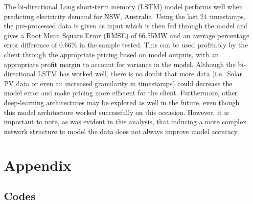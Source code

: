 \documentclass[mstat,12pt]{unswthesis}
\begin{document}
The bi-directional Long short-term memory (LSTM) model performs well
when predicting electricity demand for NSW, Australia. Using the last 24
timestamps, the pre-processed data is given as input which is then fed
through the model and gives a Root Mean Square Error (RMSE) of 66.55MW
and an average percentage error difference of 0.66\% in the sample
tested. This can be used profitably by the client through the
appropriate pricing based on model outputs, with an appropriate profit
margin to account for variance in the model. Although the bi-directional
LSTM has worked well, there is no doubt that more data (i.e.~Solar PV
data or even an increased granularity in timestamps) could decrease the
model error and make pricing more efficient for the client. Furthermore,
other deep-learning architectures may be explored as well in the future,
even though this model architecture worked successfully on this
occasion. However, it is important to note, as was evident in this
analysis, that inducing a more complex network structure to model the
data does not always improve model accuracy.




\hypertarget{appendix}{%
\chapter*{Appendix}\label{appendix}}

\hypertarget{codes}{%
\section*{\texorpdfstring{\textbf{Codes}}{Codes}}\label{codes}}
\end{document}
